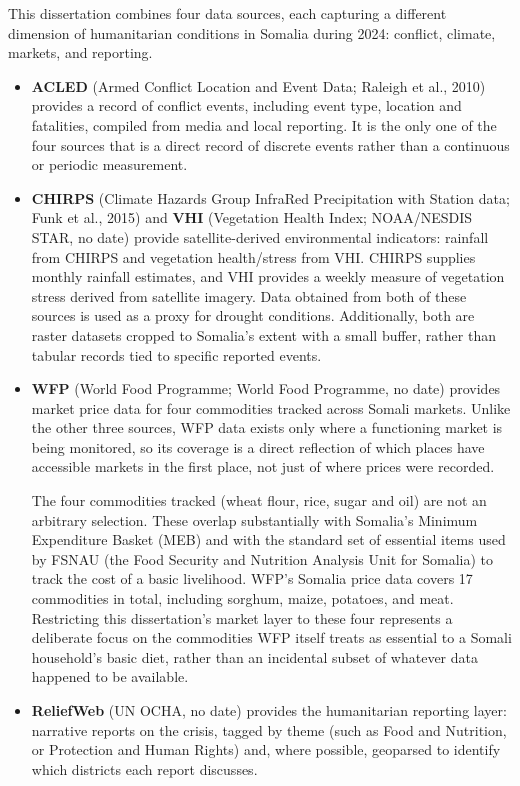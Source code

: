 \documentclass[12pt,a4paper]{article}
\begin{document}
This dissertation combines four data sources, each capturing a different dimension of humanitarian conditions in Somalia during 2024: conflict, climate, markets, and reporting.

\begin{itemize}[leftmargin=1.2cm]
\item \textbf{ACLED} (Armed Conflict Location and Event Data; Raleigh et al., 2010) provides a record of conflict events, including event type, location and fatalities, compiled from media and local reporting. It is the only one of the four sources that is a direct record of discrete events rather than a continuous or periodic measurement.

\item \textbf{CHIRPS} (Climate Hazards Group InfraRed Precipitation with Station data; Funk et al., 2015) and \textbf{VHI} (Vegetation Health Index; NOAA/NESDIS STAR, no date) provide satellite-derived environmental indicators: rainfall from CHIRPS and vegetation health/stress from VHI. CHIRPS supplies monthly rainfall estimates, and VHI provides a weekly measure of vegetation stress derived from satellite imagery. Data obtained from both of these sources is used as a proxy for drought conditions. Additionally, both are raster datasets cropped to Somalia's extent with a small buffer, rather than tabular records tied to specific reported events.

\item \textbf{WFP} (World Food Programme; World Food Programme, no date) provides market price data for four commodities tracked across Somali markets. Unlike the other three sources, WFP data exists only where a functioning market is being monitored, so its coverage is a direct reflection of which places have accessible markets in the first place, not just of where prices were recorded.

The four commodities tracked (wheat flour, rice, sugar and oil) are not an arbitrary selection. These overlap substantially with Somalia's Minimum Expenditure Basket (MEB) and with the standard set of essential items used by FSNAU (the Food Security and Nutrition Analysis Unit for Somalia) to track the cost of a basic livelihood. WFP's Somalia price data covers 17 commodities in total, including sorghum, maize, potatoes, and meat. Restricting this dissertation's market layer to these four represents a deliberate focus on the commodities WFP itself treats as essential to a Somali household's basic diet, rather than an incidental subset of whatever data happened to be available.

\item \textbf{ReliefWeb} (UN OCHA, no date) provides the humanitarian reporting layer: narrative reports on the crisis, tagged by theme (such as Food and Nutrition, or Protection and Human Rights) and, where possible, geoparsed to identify which districts each report discusses.
\end{itemize}
\end{document}
